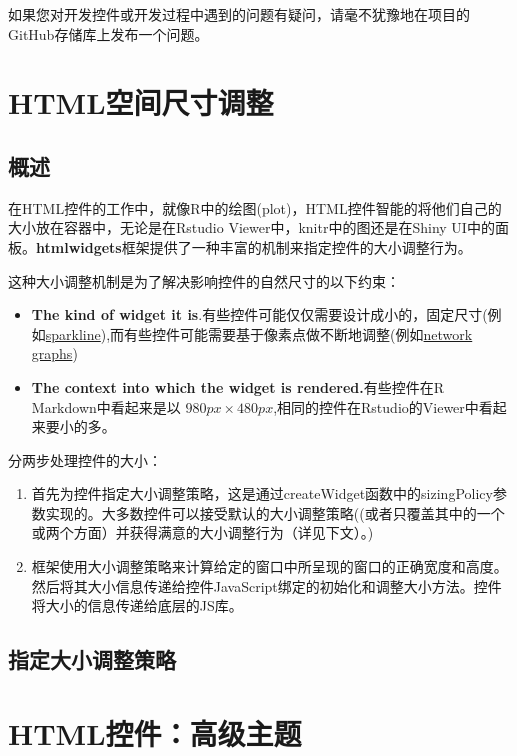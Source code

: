 \documentclass[]{book}
\theoremstyle{definition}
\theoremstyle{definition}
\theoremstyle{definition}
\theoremstyle{remark}
\begin{document}
如果您对开发控件或开发过程中遇到的问题有疑问，请毫不犹豫地在项目的GitHub存储库上发布一个问题。

\chapter{HTML空间尺寸调整}\label{htmlwidgets-Sizing}

\section{概述}

在HTML控件的工作中，就像R中的绘图(plot)，HTML控件智能的将他们自己的大小放在容器中，无论是在Rstudio
Viewer中，knitr中的图还是在Shiny
UI中的面板。\textbf{htmlwidgets}框架提供了一种丰富的机制来指定控件的大小调整行为。

这种大小调整机制是为了解决影响控件的自然尺寸的以下约束：

\begin{itemize}
\item
  \textbf{The kind of widget it
  is}.有些控件可能仅仅需要设计成小的，固定尺寸(例如\href{https://github.com/htmlwidgets/sparkline}{sparkline}),而有些控件可能需要基于像素点做不断地调整(例如\href{http://christophergandrud.github.io/networkD3/}{network
  graphs})
\item
  \textbf{The context into which the widget is rendered.}有些控件在R
  Markdown中看起来是以
  \(980px \times 480px\),相同的控件在Rstudio的Viewer中看起来要小的多。
\end{itemize}

分两步处理控件的大小：

\begin{enumerate}
\def\labelenumi{\arabic{enumi}.}
\item
  首先为控件指定大小调整策略，这是通过createWidget函数中的sizingPolicy参数实现的。大多数控件可以接受默认的大小调整策略((或者只覆盖其中的一个或两个方面）并获得满意的大小调整行为（详见下文）。)
\item
  框架使用大小调整策略来计算给定的窗口中所呈现的窗口的正确宽度和高度。然后将其大小信息传递给控件JavaScript绑定的初始化和调整大小方法。控件将大小的信息传递给底层的JS库。
\end{enumerate}

\section{指定大小调整策略}

\chapter{HTML控件：高级主题}\label{htmlwidgets-advanced}
\end{document}

